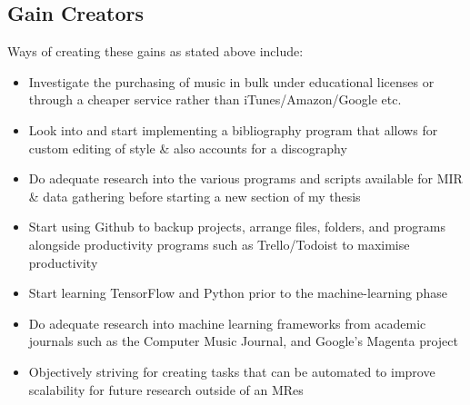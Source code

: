 \documentclass{article}
\begin{document}
\subsection {Gain Creators}
Ways of creating these gains as stated above include:
\begin{itemize}
    \item Investigate the purchasing of music in bulk under educational licenses or through a cheaper service rather than iTunes/Amazon/Google etc.
    \item Look into and start implementing a bibliography program that allows for custom editing of style \& also accounts for a discography
    \item Do adequate research into the various programs and scripts available for MIR \& data gathering before starting a new section of my thesis
    \item Start using Github to backup projects, arrange files, folders, and programs alongside productivity programs such as Trello/Todoist to maximise productivity
    \item Start learning TensorFlow and Python prior to the machine-learning phase
    \item Do adequate research into machine learning frameworks from academic journals such as the Computer Music Journal, and Google's Magenta project
    \item Objectively striving for creating tasks that can be automated to improve scalability for future research outside of an MRes 
\end{itemize}
\end{document}
